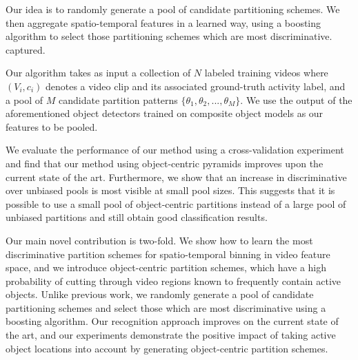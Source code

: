 \documentclass[extendedabs]{bmvc2k}
\begin{document}
  Our idea is to randomly generate a pool
  of candidate partitioning schemes. 
  We then aggregate spatio-temporal features in a
  learned way, using a boosting algorithm to select those partitioning schemes which are most discriminative.
   captured.

	Our algorithm takes as input a collection of $N$ labeled training videos 
  where $(V_i, c_i)$ denotes a video clip and its associated ground-truth
  activity label,
	and a pool of $M$ candidate partition patterns 
  $\{\theta_1, \theta_2, ..., \theta_M\}$.
  We use the output of the
  aforementioned object detectors trained on composite object models as our features to be
  pooled. %

  We evaluate the performance of our method using a cross-validation
  experiment and find that our method using object-centric pyramids improves
  upon the current state of the art. Furthermore, we show that an increase in
  discriminative over unbiased pools is most visible at small pool sizes. This
  suggests that it is possible to use a small pool of object-centric partitions
  instead of a large pool of unbiased partitions and still obtain good
  classification results.

	Our main novel contribution is two-fold. We show how to learn the most
  discriminative partition schemes for spatio-temporal binning in video feature space, and
  we introduce object-centric partition schemes, which have a high
  probability of cutting through video regions known to frequently contain
  active objects. Unlike previous work, we randomly generate a pool of
  candidate partitioning schemes and select those which are most
  discriminative using a boosting algorithm.
  Our recognition approach improves on the current state of the art, and our
  experiments demonstrate the positive impact of taking active object
  locations into account by generating object-centric partition schemes.
  
\end{document}
